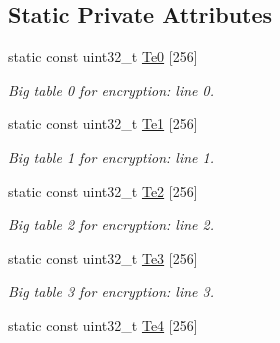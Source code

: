 \subsection*{Static Private Attributes}
\begin{DoxyCompactItemize}
\item 
\hypertarget{classAES_a6e272caeff2d73f7cb2f70fce53e41cf}{}static const uint32\+\_\+t \hyperlink{classAES_a6e272caeff2d73f7cb2f70fce53e41cf}{Te0} \mbox{[}256\mbox{]}\label{classAES_a6e272caeff2d73f7cb2f70fce53e41cf}

\begin{DoxyCompactList}\small\item\em Big table 0 for encryption\+: line 0. \end{DoxyCompactList}\item 
\hypertarget{classAES_a7b3b30f1e4f39ab755c5599c5a496883}{}static const uint32\+\_\+t \hyperlink{classAES_a7b3b30f1e4f39ab755c5599c5a496883}{Te1} \mbox{[}256\mbox{]}\label{classAES_a7b3b30f1e4f39ab755c5599c5a496883}

\begin{DoxyCompactList}\small\item\em Big table 1 for encryption\+: line 1. \end{DoxyCompactList}\item 
\hypertarget{classAES_a201232d4aa084ffa9ae7ee094c574ccb}{}static const uint32\+\_\+t \hyperlink{classAES_a201232d4aa084ffa9ae7ee094c574ccb}{Te2} \mbox{[}256\mbox{]}\label{classAES_a201232d4aa084ffa9ae7ee094c574ccb}

\begin{DoxyCompactList}\small\item\em Big table 2 for encryption\+: line 2. \end{DoxyCompactList}\item 
\hypertarget{classAES_a4f8b7b3c9c34dfccbe21b7adb9c19026}{}static const uint32\+\_\+t \hyperlink{classAES_a4f8b7b3c9c34dfccbe21b7adb9c19026}{Te3} \mbox{[}256\mbox{]}\label{classAES_a4f8b7b3c9c34dfccbe21b7adb9c19026}

\begin{DoxyCompactList}\small\item\em Big table 3 for encryption\+: line 3. \end{DoxyCompactList}\item 
\hypertarget{classAES_aaae012fe4f028129f15b86a237313232}{}static const uint32\+\_\+t \hyperlink{classAES_aaae012fe4f028129f15b86a237313232}{Te4} \mbox{[}256\mbox{]}\label{classAES_aaae012fe4f028129f15b86a237313232}


\end{DoxyCompactItemize}
